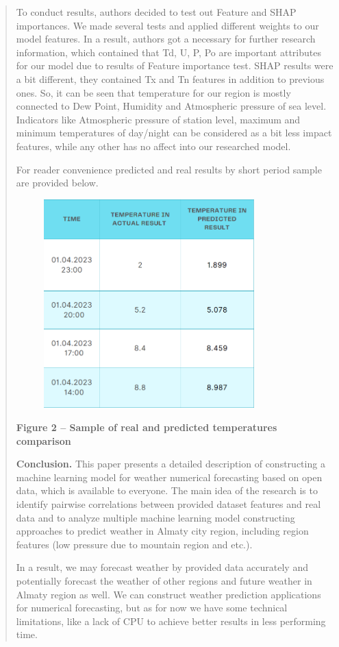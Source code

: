 \begin{quote}
To conduct results, authors decided to test out Feature and SHAP
importances. We made several tests and applied different weights to our
model features. In a result, authors got a necessary for further
research information, which contained that Td, U, P, Po are important
attributes for our model due to results of Feature importance test. SHAP
results were a bit different, they contained Tx and Tn features in
addition to previous ones. So, it can be seen that temperature for our
region is mostly connected to Dew Point, Humidity and Atmospheric
pressure of sea level. Indicators like Atmospheric pressure of station
level, maximum and minimum temperatures of day/night can be considered
as a bit less impact features, while any other has no affect into our
researched model.

For reader convenience predicted and real results by short period sample
are provided below.

\begin{figure}[H]
	\centering
	\includegraphics[width=0.8\textwidth]{assets/37}
	\caption*{}
\end{figure}

{\bfseries Figure 2 -- Sample of real and predicted temperatures
comparison}

{\bfseries Conclusion.} This paper presents a detailed description of
constructing a machine learning model for weather numerical forecasting
based on open data, which is available to everyone. The main idea of the
research is to identify pairwise correlations between provided dataset
features and real data and to analyze multiple machine learning model
constructing approaches to predict weather in Almaty city region,
including region features (low pressure due to mountain region and
etc.).

In a result, we may forecast weather by provided data accurately and
potentially forecast the weather of other regions and future weather in
Almaty region as well. We can construct weather prediction applications
for numerical forecasting, but as for now we have some technical
limitations, like a lack of CPU to achieve better results in less
performing time.
\end{quote}

